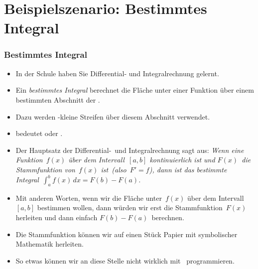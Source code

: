 \documentclass[aspectratio=169,mathserif,notheorems]{beamer}%
\begin{document}
\section{Beispielszenario: Bestimmtes Integral}%
%
\begin{frame}%
\frametitle{Bestimmtes Integral}%
\begin{itemize}%
\item In der Schule haben Sie Differential- und Integralrechnung gelernt.%
%
\item<2-> Ein \emph{bestimmtes Integral} berechnet die Fläche unter einer Funktion über einem bestimmten Abschnitt der .%
%
\item<3-> Dazu werden -kleine Streifen über diesem Abschnitt verwendet.%
%
\item<4->  bedeutet \emph{} oder \emph{}\cite{EOWM2025MWAMTD:I,KS2013LITFTMIATFFBTRAB}.
%
\item<5-> Der Hauptsatz der Differential-\ und Integralrechnung sagt aus\cite{W2024MAWWR:SFTOC,A1991C:1:PFATSFTOC}: \emph{Wenn eine Funktion~$f(x)$ über dem Intervall~$[a,b]$ kontinuierlich ist und $F(x)$~die Stammfunktion von~$f(x)$ ist~(also~$F'=f$), dann ist das bestimmte Integral~$\int_a^b f(x)\,dx = F(b)-F(a)$.}%
%
\item<6-> Mit anderen Worten, wenn wir die Fläche unter~$f(x)$ über dem Intervall~$[a,b]$ bestimmen wollen, dann würden wir erst die Stammfunktion~$F(x)$ herleiten und dann einfach $F(b)-F(a)$~berechnen.%
%
\item<7-> Die Stammfunktion können wir auf einen Stück Papier mit symbolischer Mathematik herleiten.%
%
\item<8-> So etwas können wir an diese Stelle nicht wirklich mit \python\ programmieren.%
%
\end{itemize}%
%
\end{frame}%
%
\end{document}
